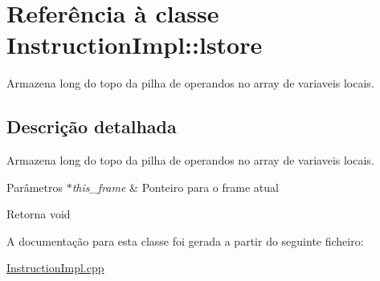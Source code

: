 \hypertarget{class_instruction_impl_1_1lstore}{}\section{Referência à classe Instruction\+Impl\+:\+:lstore}
\label{class_instruction_impl_1_1lstore}


Armazena long do topo da pilha de operandos no array de variaveis locais.  




\subsection{Descrição detalhada}
Armazena long do topo da pilha de operandos no array de variaveis locais. 


\begin{DoxyParams}{Parâmetros}
{\em $\ast$this\+\_\+frame} & Ponteiro para o frame atual \\
\hline
\end{DoxyParams}
\begin{DoxyReturn}{Retorna}
void 
\end{DoxyReturn}


A documentação para esta classe foi gerada a partir do seguinte ficheiro\+:\begin{DoxyCompactItemize}
\item 
\hyperlink{_instruction_impl_8cpp}{Instruction\+Impl.\+cpp}\end{DoxyCompactItemize}
